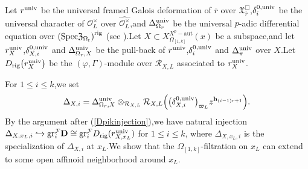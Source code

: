 \documentclass[SecEq,CM,GP]{degruyter-crelle} %
\theoremstyle{plain}
\newcommand{\Dpik}{{\mathbf{D}}}
\newcommand{\gr}{{\rm gr}}
\newcommand{\omepik}{\Omega_{[1,k]}}
\newcommand{\rig}{{\rm rig}}
\newcommand{\Spec}{\rm Spec}
\newcommand{\sbanpi}{{\left(\Spec\mathfrak{Z}_{\Omega_{r}}\right)^{\mathrm{rig}}}}
\newcommand{\univer}{{\rm univ}}
\newcommand{\xfpx}{X^{X^\fp-\mathrm{aut}}_{\omepik}(x)}
\newcommand{\bh}{{\mathbf{h}}}
\newcommand{\cR}{\mathcal R}
\newcommand{\cF}{\mathcal F}
\newcommand{\cO}{\mathcal O}
\newcommand{\fp}{{\mathfrak{p}}}
\begin{document}
Let $r^{\univer}$ be the universal framed Galois deformation of $\overline{r}$ over $\mathfrak{X}_{\overline{r}}^\Box$,\;$\delta_i^{0,\univer}$ be the universal character of $\cO_L^\times$ over $\widehat{\cO_L^\times}$,\;and $\Delta^{\univer}_{\Omega_r}$ be the universal $p$-adic differential equation over $\sbanpi$ (see \cite[Section 2.2]{Ding2021}).\;Let $X\subset \xfpx$ be a subspace,\;and let $r^{\univer}_{X}$,\;$\delta_{X,i}^{0,\univer}$ and $\Delta^{\univer}_{\Omega_r,X}$ be the pull-back of $r^{\univer}$,\;$\delta_{i}^{0,\univer}$ and $\Delta^{\univer}_{\pi}$ over $X$.\;Let $D_{\rig}\big(r^{\univer}_X\big)$ be the $(\varphi,\Gamma)$-module over $\cR_{X,L}$ associated to $r^{\univer}_{X}$.\;

For $1\leq i\leq k$,\;we set
\[\Delta_{X,i}=\Delta^{\univer}_{\Omega_r,X}\otimes_{\cR_{X,L}}\cR_{X,L}\Big(\big(\delta_{X,i}^{0,\univer}\big)_{\varpi_L}z^{{\bh}_{(i-1)r+1}}\Big).\]
By the argument after (\ref{Dpikinjection}),\;we have natural injection $\Delta_{X,x_L,i}\hookrightarrow \gr^{\cF}_i\Dpik\cong \gr_i^{\cF}D_{\rig}(r^{\univer}_{X,x_L})$ for $1\leq i\leq k$, where $\Delta_{X,x_L,i}$ is the specialization of $\Delta_{X,i}$ at $x_L$.\;We show that the  $\omepik$-filtration on $x_L$ can extend to some open affinoid neighborhood around $x_L$.\;
\end{document}
